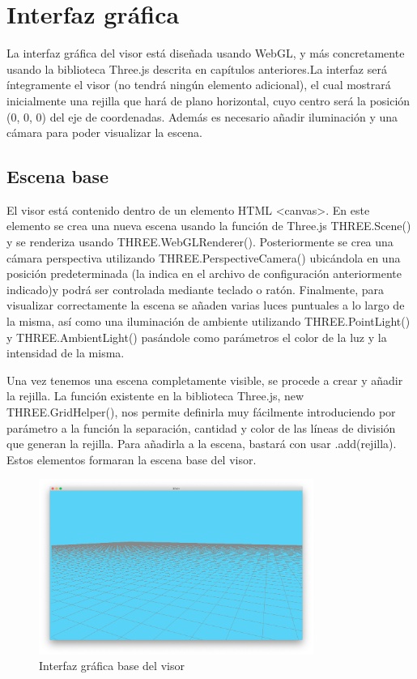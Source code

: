 \section{Interfaz gráfica}
La interfaz gráfica del visor está diseñada usando WebGL, y más concretamente usando la biblioteca Three.js descrita en capítulos anteriores.La interfaz será íntegramente el visor (no tendrá ningún elemento adicional), el cual mostrará inicialmente una rejilla que hará de plano horizontal, cuyo centro será la posición (0, 0, 0) del eje de coordenadas. Además es necesario añadir iluminación y una cámara para poder visualizar la escena.

\subsection{Escena base}
El visor está contenido dentro de un elemento HTML <canvas>. En este elemento se crea una nueva escena usando la función de Three.js THREE.Scene() y se renderiza usando THREE.WebGLRenderer(). Posteriormente se crea una cámara perspectiva utilizando THREE.PerspectiveCamera() ubicándola en una posición predeterminada (la indica en el archivo de configuración anteriormente indicado)y podrá ser controlada mediante teclado o ratón. Finalmente, para visualizar correctamente la escena se añaden varias luces puntuales a lo largo de la misma, así como una iluminación de ambiente utilizando THREE.PointLight() y THREE.AmbientLight() pasándole como parámetros el color de la luz y la intensidad de la misma.


Una vez tenemos una escena completamente visible, se procede a crear y añadir la rejilla. La función existente en la biblioteca Three.js, new THREE.GridHelper(), nos permite definirla muy fácilmente introduciendo por parámetro a la función la separación, cantidad y color de las líneas de división que generan la rejilla. Para añadirla a la escena, bastará con usar .add(rejilla). Estos elementos formaran la escena base del visor.

\begin{figure}[H]
  \begin{center}
    \includegraphics[width=0.8\textwidth]{figures/interfazinicial.png}
		\caption{Interfaz gráfica base del visor}
		\label{fig.interfazinicial}
		\end{center}
\end{figure}

